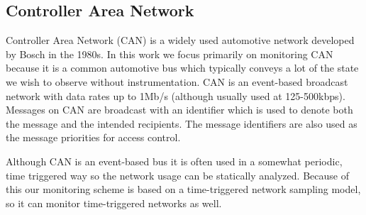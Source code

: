 \subsection{Controller Area Network}
Controller Area Network (CAN) is a widely used automotive network developed by Bosch in the 1980s. 
In this work we focus primarily on monitoring CAN because it is a common automotive bus which typically conveys a lot of the state we wish to observe without instrumentation.
%
CAN is an event-based broadcast network with data rates up to 1Mb/s (although usually used at 125-500kbps). Messages on CAN are broadcast with an identifier which is used to denote both the message and the intended recipients. The message identifiers are also used as the message priorities for access control.

Although CAN is an event-based bus it is often used in a somewhat periodic, time triggered way so the network usage can be statically analyzed. Because of this our monitoring scheme is based on a time-triggered network sampling model, so it can monitor time-triggered networks as well.

